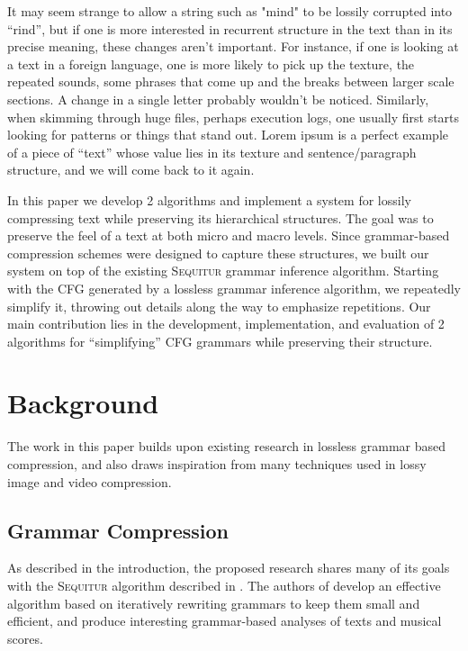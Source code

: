 \documentclass[11pt]{article}
\newcommand{\Sequitur}{\textsc{Sequitur}\xspace}
\begin{document}
It may seem strange to allow a string such as "mind" to be lossily corrupted
into ``rind'', but if one is more interested in recurrent structure in the text
than in its precise meaning, these changes aren't important. For instance, if
one is looking at a text in a foreign language, one is more likely to pick up
the texture, the repeated sounds, some phrases that come up and the breaks
between larger scale sections.  A change in a single letter probably wouldn't
be noticed. Similarly, when skimming through huge files, perhaps execution
logs, one usually first starts looking for patterns or things that stand out.
Lorem ipsum is a perfect example of a piece of ``text'' whose value lies in its
texture and sentence/paragraph structure, and we will come back to it again.

In this paper we develop 2 algorithms and implement a system for lossily
compressing text while preserving its hierarchical structures. The goal was to
preserve the feel of a text at both micro and macro levels.  Since
grammar-based compression schemes were designed to capture these structures, we
built our system on top of the existing \Sequitur grammar inference algorithm.
Starting with the CFG generated by a lossless grammar inference algorithm, we
repeatedly simplify it, throwing out details along the way to emphasize
repetitions. Our main contribution lies in the development, implementation, and
evaluation of 2 algorithms for ``simplifying'' CFG grammars while preserving
their structure.

\section{Background}

The work in this paper builds upon existing research in lossless grammar based
compression, and also draws inspiration from many techniques used in lossy
image and video compression.

\subsection{Grammar Compression}

As described in the introduction, the proposed research shares many of its
goals with the \Sequitur algorithm described in \cite{sequitur}.  The authors
of \cite{sequitur} develop an effective algorithm based on iteratively
rewriting grammars to keep them small and efficient, and produce interesting
grammar-based analyses of texts and musical scores.
\end{document}
